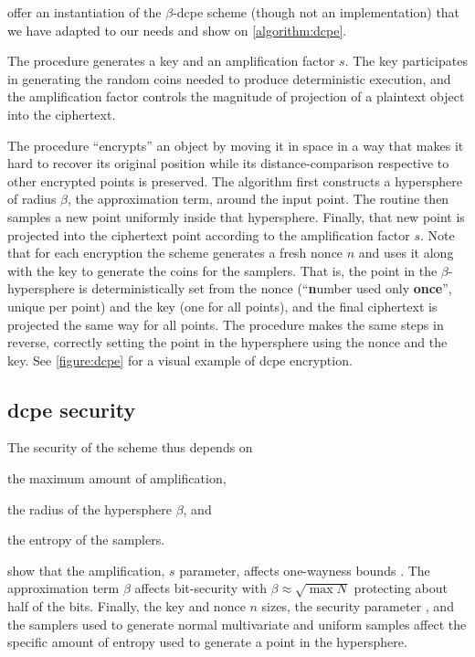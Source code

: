 			

			\textcite{dcpe} offer an instantiation of the $\beta$-\acrshort{dcpe} scheme (though not an implementation) that we have adapted to our needs and show on \cref{algorithm:dcpe}.

			The  procedure generates a key \key{} and an amplification factor $s$.
			The key participates in generating the random coins needed to produce deterministic execution, and the amplification factor controls the magnitude of projection of a plaintext object into the ciphertext.

			The  procedure ``encrypts'' an object by moving it in space in a way that makes it hard to recover its original position while its distance-comparison respective to other encrypted points is preserved.
			The algorithm first constructs a hypersphere of radius $\beta$, the approximation term, around the input point.
			The routine then samples a new point uniformly inside that hypersphere.
			Finally, that new point is projected into the ciphertext point according to the amplification factor $s$.
			Note that for each encryption the scheme generates a fresh nonce $n$ and uses it along with the key \key{} to generate the coins for the samplers.
			That is, the point in the $\beta$-hypersphere is deterministically set from the nonce (``\textbf{n}umber used only \textbf{once}'', unique per point) and the key (one for all points), and the final ciphertext is projected the same way for all points.
			The  procedure makes the same steps in reverse, correctly setting the point in the hypersphere using the nonce and the key.
			See \cref{figure:dcpe} for a visual example of \acrshort{dcpe} encryption.

			

		\subsection{\texorpdfstring{\acrshort{dcpe}}{DCPE} security}

			The security of the scheme thus depends on
			\begin{enumerate*}[label={(\roman*)}]
				\item the maximum amount of amplification,
				\item the radius of the hypersphere $\beta$, and
				\item the entropy of the samplers.
			\end{enumerate*}
			\textcite{dcpe} show that the amplification, $s$ parameter, affects one-wayness bounds \cite[Section 7.2]{dcpe}.
			The approximation term $\beta$ affects bit-security with $\beta \approx \sqrt{\max N}$ protecting about half of the bits.
			Finally, the key \key{} and nonce $n$ sizes, the security parameter \secparam{}, and the samplers used to generate normal multivariate and uniform samples affect the specific amount of entropy used to generate a point in the hypersphere.

